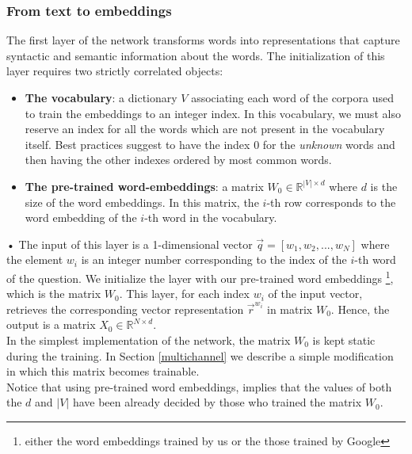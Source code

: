 \documentclass[10pt,twocolumn,letterpaper]{article}
\begin{document}
\subsubsection{From text to embeddings}
The first layer of the network transforms words into representations that capture syntactic and semantic information about the words. The initialization of this layer requires two strictly correlated objects:
\begin{itemize}
\item \textbf{The vocabulary}: a dictionary $V$ associating each word of the corpora used to train the embeddings to an integer index. In this vocabulary, we must also reserve an index for all the words which are not present in the vocabulary itself. Best practices suggest to have the index $0$ for the \emph{unknown} words and then having the other indexes ordered by most common words.
\item \textbf{The pre-trained word-embeddings}: a matrix $W_0 \in \mathbb{R}^{|V| \times d}$ where $d$ is the size of the word embeddings. In this matrix, the $i$-th row corresponds to the word embedding of the $i$-th word in the vocabulary.
\end{itemize}•
The input of this layer is a 1-dimensional vector $\vec{q}=[w_1, w_2, ... , w_N]$ where the element $w_i$ is an integer number corresponding to the index of the $i$-th word of the question. We initialize the layer with our pre-trained word embeddings \footnote{either the word embeddings trained by us or the those trained by Google}, which is the matrix $W_0$. This layer, for each index $w_i$ of the input vector, retrieves the corresponding vector representation $\vec{r}^{w_i}$ in matrix $W_0$. Hence, the output is a matrix $X_0 \in \mathbb{R}^{N \times d}$.\\
In the simplest implementation of the network, the matrix $W_0$ is kept static during the training. In Section \ref{multichannel} we describe a simple modification in which this matrix becomes trainable.\\
Notice that using pre-trained word embeddings, implies that the values of both the $d$ and $|V|$ have been already decided by those who trained the matrix $W_0$.
\end{document}
